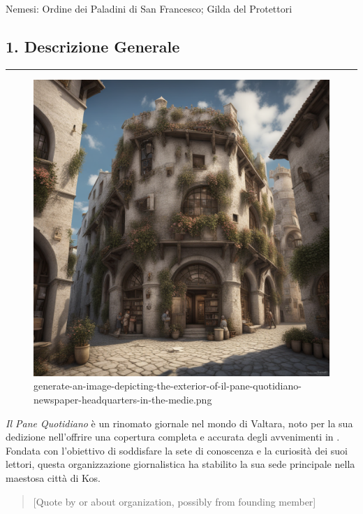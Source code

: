 Nemesi: Ordine dei Paladini di San Francesco; Gilda del Protettori

\subsection{1. Descrizione Generale}\label{descrizione-generale}

\begin{center}\rule{0.5\linewidth}{0.5pt}\end{center}

\begin{figure}
\centering
\includegraphics{generate-an-image-depicting-the-exterior-of-il-pane-quotidiano-newspaper-headquarters-in-the-medie.png}
\caption{generate-an-image-depicting-the-exterior-of-il-pane-quotidiano-newspaper-headquarters-in-the-medie.png}
\end{figure}

\emph{Il Pane Quotidiano} è un rinomato giornale nel mondo di Valtara,
noto per la sua dedizione nell'offrire una copertura completa e accurata
degli avvenimenti in . Fondata con l'obiettivo di soddisfare la sete di
conoscenza e la curiosità dei suoi lettori, questa organizzazione
giornalistica ha stabilito la sua sede principale nella maestosa città
di Kos.

\begin{quote}
{[}Quote by or about organization, possibly from founding member{]}
\end{quote}

